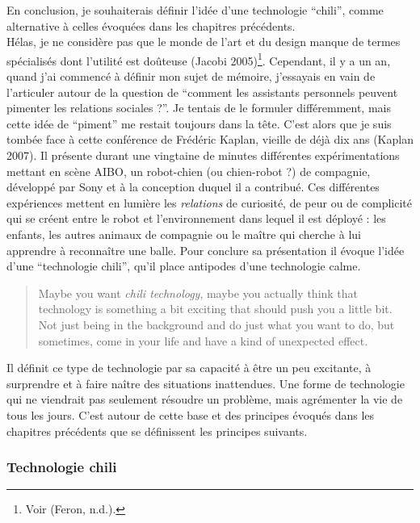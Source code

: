 \documentclass[]{article}
\begin{document}
En conclusion, je souhaiterais définir l'idée d'une technologie
``chili'', comme alternative à celles évoquées dans les chapitres
précédents.\\
Hélas, je ne considère pas que le monde de l'art et du design manque de
termes spécialisés dont l'utilité est doûteuse (Jacobi 2005)\footnote{Voir
  (Feron, n.d.).}. Cependant, il y a un an, quand j'ai commencé à
définir mon sujet de mémoire, j'essayais en vain de l'articuler autour
de la question de ``comment les assistants personnels peuvent pimenter
les relations sociales ?''. Je tentais de le formuler différemment, mais
cette idée de ``piment'' me restait toujours dans la tête. C'est alors
que je suis tombée face à cette conférence de Frédéric Kaplan, vieille
de déjà dix ans (Kaplan 2007). Il présente durant une vingtaine de
minutes différentes expérimentations mettant en scène AIBO, un
robot-chien (ou chien-robot ?) de compagnie, développé par Sony et à la
conception duquel il a contribué. Ces différentes expériences mettent en
lumière les \emph{relations} de curiosité, de peur ou de complicité qui
se créent entre le robot et l'environnement dans lequel il est déployé :
les enfants, les autres animaux de compagnie ou le maître qui cherche à
lui apprendre à reconnaître une balle. Pour conclure sa présentation il
évoque l'idée d'une ``technologie chili'', qu'il place antipodes d'une
technologie calme.

\begin{quote}
Maybe you want \emph{chili technology}, maybe you actually think that
technology is something a bit exciting that should push you a little
bit. Not just being in the background and do just what you want to do,
but sometimes, come in your life and have a kind of unexpected effect.
\end{quote}

Il définit ce type de technologie par sa capacité à être un peu
excitante, à surprendre et à faire naître des situations inattendues.
Une forme de technologie qui ne viendrait pas seulement résoudre un
problème, mais agrémenter la vie de tous les jours. C'est autour de
cette base et des principes évoqués dans les chapitres précédents que se
définissent les principes suivants.

\newpage

\hypertarget{technologie-chili}{%
\subsubsection{Technologie chili}\label{technologie-chili}}
\end{document}
